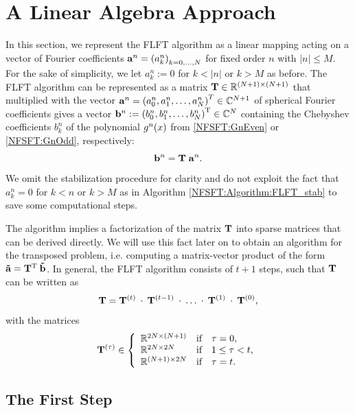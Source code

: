 \section{A Linear Algebra Approach}
\label{DSFT:LinearAlgebra}

In this section, we represent the FLFT algorithm as a linear mapping acting on a vector of Fourier coefficients 
$\mathbf{a}^n = \left(a_{k}^n\right)_{k=0,\ldots,N}$ for fixed order $n$ with $|n| \le M$. For the sake of simplicity,
we let $a_{k}^n := 0$ for $k < |n|$ or $k > M$ as before.
The FLFT algorithm can be represented as a matrix $\mathbf{T} \in \mathbb{R}^{(N+1) \times (N+1)}$ that multiplied with the vector 
$\mathbf{a}^n = \left(a_0^n,a_1^n,\dots,a_N^n\right)^T \in \mathbb{C}^{N+1}$ of spherical Fourier coefficients gives a vector 
$\mathbf{b}^n := \left(b_0^n,b_1^n,\dots,b_{N}^n\right)^{\text{\rm{T}}} \in \mathbb{C}^{N}$ containing the Chebyshev coefficients 
$b_{k}^n$ of the polynomial $g^n{\hspace{-0.4ex}}\left(x\right)$ from \eqref{NFSFT:GnEven} or \eqref{NFSFT:GnOdd}, respectively: 
\[\mathbf{b}^{n} = \mathbf{T} \; \mathbf{a}^n.\] 
We omit the stabilization procedure for clarity and do not exploit the fact that $a_{k}^n = 0$ for 
$k < n$ or $k > M$ as in Algorithm \ref{NFSFT:Algorithm:FLFT_stab} to save some computational steps.

The algorithm implies a factorization of the matrix $\mathbf{T}$ into sparse matrices that can be derived directly.
We will use this fact later on to obtain an algorithm for the transposed problem, i.e. computing 
a matrix-vector product of the form $\mathbf{\tilde{a}} = \mathbf{T}^{\text{\rm{T}}}\:\mathbf{\tilde{b}}$. In general, the FLFT algorithm consists 
of $t+1$ steps, such that $\mathbf{T}$ can be written as 
\[
  \mathbf{T} = \mathbf{T}^{(t)} \: \cdot \:  \mathbf{T}^{(t-1)} \: \cdot \: \dots \: \cdot \: \mathbf{T}^{(1)} \: \cdot \:  \mathbf{T}^{(0)},
\]
with the matrices 
\[
 \V{T}^{(\tau)} \in \left\{\begin{array}{l@{\quad \text{if} \quad}l} \R^{2N \times (N+1)} & \tau = 0, \\ \R^{2N \times 2N} & 1 \le \tau < t, \\ \R^{(N+1) \times 2N} & \tau = t. \end{array}\right.
\]

\subsection{The First Step}

